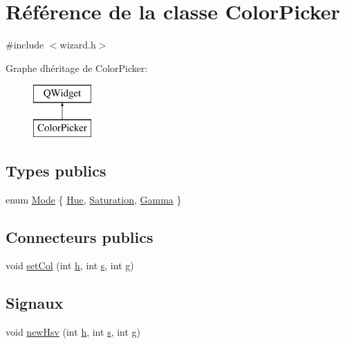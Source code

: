 \hypertarget{class_color_picker}{}\section{Référence de la classe Color\+Picker}
\label{class_color_picker}


{\ttfamily \#include $<$wizard.\+h$>$}

Graphe d\textquotesingle{}héritage de Color\+Picker\+:\begin{figure}[H]
\begin{center}
\leavevmode
\includegraphics[height=2.000000cm]{class_color_picker}
\end{center}
\end{figure}
\subsection*{Types publics}
\begin{DoxyCompactItemize}
\item 
enum \hyperlink{class_color_picker_aedde1e35d1e2d87b4d834b0642db277f}{Mode} \{ \hyperlink{class_color_picker_aedde1e35d1e2d87b4d834b0642db277fafce5e7224652189e1611aa554abf4f49}{Hue}, 
\hyperlink{class_color_picker_aedde1e35d1e2d87b4d834b0642db277fa10692f8ee3ebfa97e654c763bb7b13ab}{Saturation}, 
\hyperlink{class_color_picker_aedde1e35d1e2d87b4d834b0642db277facd430546ff5346545085a0e0cbc33e8d}{Gamma}
 \}
\end{DoxyCompactItemize}
\subsection*{Connecteurs publics}
\begin{DoxyCompactItemize}
\item 
void \hyperlink{class_color_picker_ad0c1604896c745f11f1368ff4b64382f}{set\+Col} (int \hyperlink{060__command__switch_8tcl_af96fd0966e32a310a0778d2e5c357700}{h}, int \hyperlink{060__command__switch_8tcl_a011c73f2dbb87635a3b4206c72355f6e}{s}, int \hyperlink{060__command__switch_8tcl_af08b4b5bfa9edf0b0a7dee1c2b2c29e0}{g})
\end{DoxyCompactItemize}
\subsection*{Signaux}
\begin{DoxyCompactItemize}
\item 
void \hyperlink{class_color_picker_ae507629d5160af8c6b206b2901de5b2f}{new\+Hsv} (int \hyperlink{060__command__switch_8tcl_af96fd0966e32a310a0778d2e5c357700}{h}, int \hyperlink{060__command__switch_8tcl_a011c73f2dbb87635a3b4206c72355f6e}{s}, int \hyperlink{060__command__switch_8tcl_af08b4b5bfa9edf0b0a7dee1c2b2c29e0}{g})
\end{DoxyCompactItemize}
